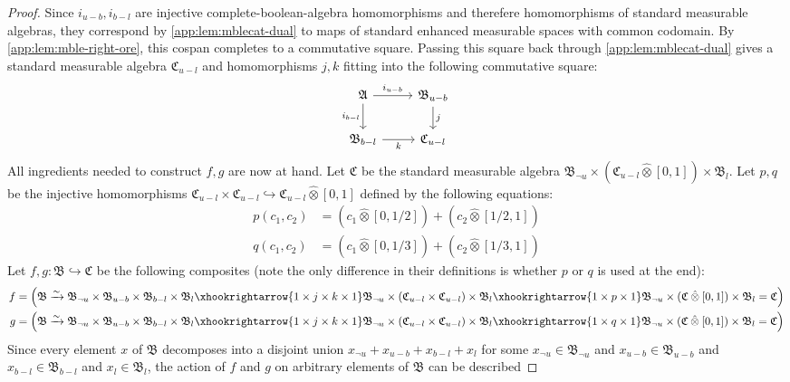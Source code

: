 \documentclass[
  sigconf,
  screen, ]{acmart}
\theoremstyle{definition}
\newcommand\frakA{\mathfrak A}
\newcommand\frakB{\mathfrak B}
\newcommand\frakC{\mathfrak C}
\newcommand\commsquare[8]{
\begin{tikzcd}[ampersand replacement=\&]
{#1} \arrow[d, "{#4}"'] \arrow[r, "{#2}"] \& {#3} \arrow[d, "{#5}"] \\
{#6} \arrow[r, "{#7}"']                \& {#8}
\end{tikzcd}
}
\newcommand\lmafp{\mathbin{\hat\otimes}}
\begin{document}
\begin{proof}
  Since $i_{u-b},i_{b-l}$ are injective complete-boolean-algebra homomorphisms
  and therefere homomorphisms of standard measurable algebras, they correspond
  by \cref{app:lem:mblecat-dual}
  to maps of standard enhanced measurable spaces with common codomain.
  By \cref{app:lem:mble-right-ore}, this cospan
  completes to a commutative square.
  Passing this square back through \cref{app:lem:mblecat-dual}
  gives 
  a standard measurable algebra $\frakC_{u-l}$
  and homomorphisms $j,k$
  fitting into the following commutative square:
  \[\commsquare{\frakA}{i_{u-b}}{\frakB_{u-b}}{i_{b-l}}{j}{\frakB_{b-l}}{k}{\frakC_{u-l}}\]
  All ingredients needed to construct $f,g$ are now at hand.
  Let $\frakC$ be the standard measurable algebra $\frakB_{\neg u}\times (\frakC_{u-l}\lmafp[0,1]) \times \frakB_l$.
  Let $p,q$ be the injective homomorphisms $\frakC_{u-l}\times\frakC_{u-l}\hookrightarrow \frakC_{u-l}\lmafp[0,1]$
  defined by the following equations:
  \begin{align*}
     p(c_1,c_2) &= (c_1\lmafp [0,1/2]) + (c_2\lmafp [1/2,1]) \\
     q(c_1,c_2) &= (c_1\lmafp [0,1/3]) + (c_2\lmafp [1/3,1]) 
  \end{align*}
  Let $f,g : \frakB\hookrightarrow\frakC$ be the following composites
  (note the only difference in their definitions is whether $p$ or $q$ is used at the end):
  \begin{align*}
     f &= \left(\frakB
       \xrightarrow{\sim} \frakB_{\neg u}\times \frakB_{u-b}\times\frakB_{b-l}\times \frakB_l
       \xhookrightarrow{1 \times j\times k \times 1} \frakB_{\neg u}\times (\frakC_{u-l}\times\frakC_{u-l})\times \frakB_l
       \xhookrightarrow{1 \times p \times 1} \frakB_{\neg u}\times (\frakC\lmafp[0,1])\times \frakB_l
       =\frakC
       \right) \\
     g &= \left(\frakB
       \xrightarrow{\sim} \frakB_{\neg u}\times \frakB_{u-b}\times\frakB_{b-l}\times \frakB_l
       \xhookrightarrow{1 \times j\times k \times 1} \frakB_{\neg u}\times (\frakC_{u-l}\times\frakC_{u-l})\times \frakB_l
       \xhookrightarrow{1 \times q \times 1} \frakB_{\neg u}\times (\frakC\lmafp[0,1])\times \frakB_l
       =\frakC
       \right) 
  \end{align*}
  Since every element $x$ of $\frakB$ decomposes into a disjoint union
  $x_{\neg u} +x_{u-b} + x_{b-l} + x_l$ for some $x_{\neg u}\in\frakB_{\neg u}$
  and $x_{u-b} \in\frakB_{u-b}$ and $x_{b-l}\in\frakB_{b-l}$ and $x_l\in\frakB_l$,
  the action of $f$ and $g$ on arbitrary elements of $\frakB$ can be described 

\end{proof}
\end{document}

